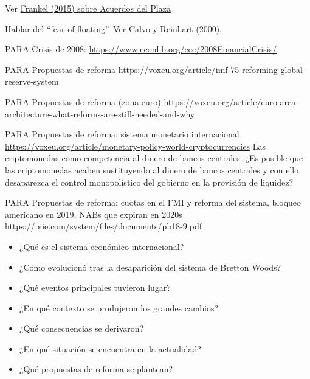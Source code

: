 \documentclass{nuevotema}
\begin{document}
\ideaclave

Ver \href{https://www.nber.org/papers/w21813.pdf}{Frankel (2015) sobre Acuerdos del Plaza}

Hablar del ``fear of floating''. Ver Calvo y Reinhart (2000).

PARA Crisis de 2008: \url{https://www.econlib.org/cee/2008FinancialCrisis/}

PARA Propuestas de reforma
https://voxeu.org/article/imf-75-reforming-global-reserve-system

PARA Propuestas de reforma (zona euro)
https://voxeu.org/article/euro-area-architecture-what-reforms-are-still-needed-and-why

PARA Propuestas de reforma: sistema monetario internacional
\url{https://voxeu.org/article/monetary-policy-world-cryptocurrencies} Las criptomonedas como competencia al dinero de bancos centrales. ¿Es posible que las criptomonedas acaben sustituyendo al dinero de bancos centrales y con ello desaparezca el control monopolístico del gobierno en la provisión de liquidez?

PARA Propuestas de reforma: cuotas en el FMI y reforma del sistema, bloqueo americano en 2019, NABs que expiran en 2020s  https://piie.com/system/files/documents/pb18-9.pdf 


\begin{itemize}
	\item ¿Qué es el sistema económico internacional?
	\item ¿Cómo evolucionó tras la desaparición del sistema de Bretton Woods?
	\item ¿Qué eventos principales tuvieron lugar?
	\item ¿En qué contexto se produjeron los grandes cambios?
	\item ¿Qué consecuencias se derivaron?
	\item ¿En qué situación se encuentra en la actualidad?
	\item ¿Qué propuestas de reforma se plantean?
\end{itemize}

\esquemacorto
\end{document}
